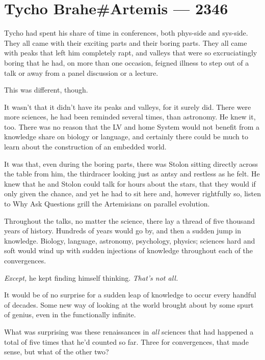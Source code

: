 \hypertarget{tycho-braheartemis-2346}{%
\chapter{Tycho Brahe\#Artemis — 2346}\label{tycho-braheartemis-2346}}

Tycho had spent his share of time in conferences, both phys-side and sys-side. They all came with their exciting parts and their boring parts. They all came with peaks that left him completely rapt, and valleys that were so excruciatingly boring that he had, on more than one occasion, feigned illness to step out of a talk or away from a panel discussion or a lecture.

This was different, though.

It wasn't that it didn't have its peaks and valleys, for it surely did. There were more sciences, he had been reminded several times, than astronomy. He knew it, too. There was no reason that the LV and home System would not benefit from a knowledge share on biology or language, and certainly there could be much to learn about the construction of an embedded world.

It was that, even during the boring parts, there was Stolon sitting directly across the table from him, the thirdracer looking just as antsy and restless as he felt. He knew that he and Stolon could talk for hours about the stars, that they would if only given the chance, and yet he had to sit here and, however rightfully so, listen to Why Ask Questions grill the Artemisians on parallel evolution.

Throughout the talks, no matter the science, there lay a thread of five thousand years of history. Hundreds of years would go by, and then a sudden jump in knowledge. Biology, language, astronomy, psychology, physics; sciences hard and soft would wind up with sudden injections of knowledge throughout each of the convergences.

\emph{Except,} he kept finding himself thinking. \emph{That's not all.}

It would be of no surprise for a sudden leap of knowledge to occur every handful of decades. Some new way of looking at the world brought about by some spurt of genius, even in the functionally infinite.

What was surprising was these renaissances in \emph{all} sciences that had happened a total of five times that he'd counted so far. Three for convergences, that made sense, but what of the other two?

